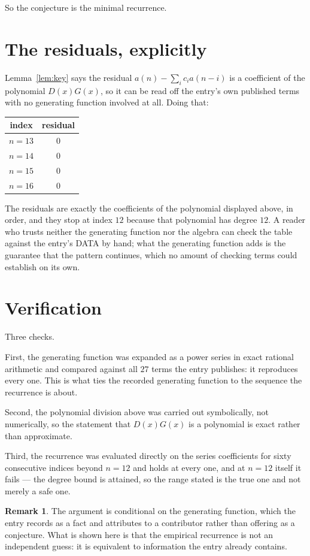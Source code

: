 \documentclass[11pt,a4paper]{article}
\theoremstyle{plain}
\theoremstyle{definition}
\newtheorem{remark}[theorem]{Remark}
\begin{document}
So the conjecture is the minimal recurrence.

\section{The residuals, explicitly}

Lemma~\ref{lem:key} says the residual $a(n)-\sum_ic_ia(n-i)$ is a coefficient of the
polynomial $D(x)G(x)$, so it can be read off the entry's own published terms with no
generating function involved at all. Doing that:
\begin{center}
\begin{tabular}{cc}
index & residual \\ \hline
$n=13$ & $0$ \\
$n=14$ & $0$ \\
$n=15$ & $0$ \\
$n=16$ & $0$
\end{tabular}
\end{center}
The residuals are exactly the coefficients of the polynomial displayed above, in order, and
they stop at index $12$ because that polynomial has degree $12$. A reader who trusts
neither the generating function nor the algebra can check the table against the entry's DATA
by hand; what the generating function adds is the guarantee that the pattern continues, which
no amount of checking terms could establish on its own.

\section{Verification}

Three checks.

First, the generating function was expanded as a power series in exact rational arithmetic and
compared against all $27$ terms the entry publishes: it reproduces every one. This is
what ties the recorded generating function to the sequence the recurrence is about.

Second, the polynomial division above was carried out symbolically, not numerically, so the
statement that $D(x)G(x)$ is a polynomial is exact rather than approximate.

Third, the recurrence was evaluated directly on the series coefficients for sixty consecutive
indices beyond $n=12$ and holds at every one, and at $n=12$ itself it fails --- the
degree bound is attained, so the range stated is the true one and not merely a safe one.

\begin{remark}
The argument is conditional on the generating function, which the entry records as a fact and
attributes to a contributor rather than offering as a conjecture. What is shown here is that
the empirical recurrence is not an independent guess: it is equivalent to information the
entry already contains.
\end{remark}
\end{document}

